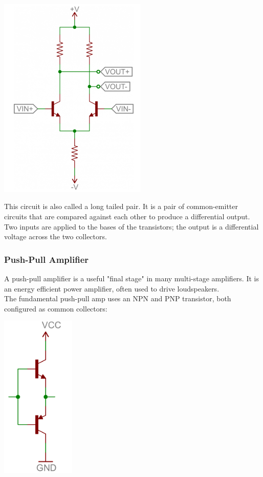 \documentclass[a4paper, 11pt]{article} %
\begin{document}
\begin{center}
\includegraphics[width=200pt]{tran28}
\end{center}

This circuit is also called a long tailed pair. It is a pair of common-emitter circuits that are compared against each other to produce a differential output. Two inputs are applied to the bases of the transistors; the output is a differential voltage across the two collectors.

\subsubsection*{Push-Pull Amplifier}

A push-pull amplifier is a useful "final stage" in many multi-stage amplifiers. It is an energy efficient power amplifier, often used to drive loudspeakers.\\

The fundamental push-pull amp uses an NPN and PNP transistor, both configured as common collectors:

\begin{center}
\includegraphics[width=100pt]{tran29}
\end{center}
\end{document}

